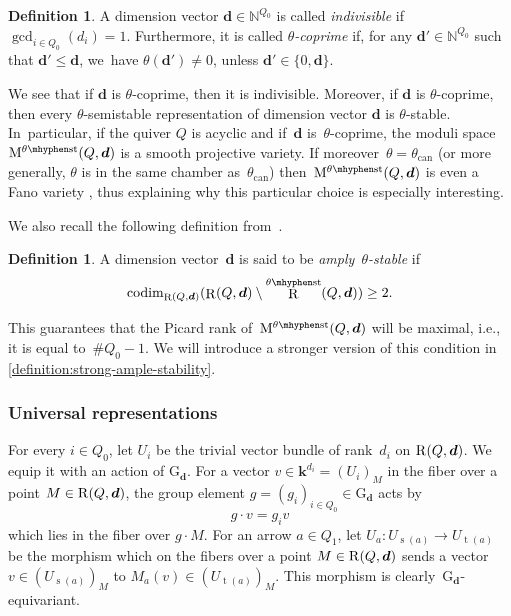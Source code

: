 \documentclass[11pt]{article}
\theoremstyle{plain}
\theoremstyle{definition}
\newtheorem{definition}[theorem]{Definition}
\DeclareMathOperator\Rep{R}
\DeclareMathOperator\source{s}
\DeclareMathOperator\target{t}
\newcommand\can{\ensuremath{\mathrm{can}}}
\newcommand\dash{\nobreakdash-\hspace{0pt}}
\newcommand\field{\mathbf{k}}
\newcommand\group[1][\tuple{d}]{\mathrm{G}_{#1}}
\newcommand\stable{\ensuremath{\mhyphen\mathrm{st}}}
\newcommand\tuple[1]{\ensuremath{{\boldsymbol{#1}}}}
\begin{document}
\begin{definition}
A dimension vector $\tuple{d} \in \mathbb{N}^{Q_0}$ is called \emph{indivisible}
if $\gcd_{i \in Q_0}(d_i) = 1$.
Furthermore, it is called \emph{$\theta$-coprime} if,
for any $\tuple{d'} \in \mathbb{N}^{Q_0}$ such that $\tuple{d'} \leq \tuple{d}$, we~have $\theta(\tuple{d'}) \neq 0$,
unless $\tuple{d'} \in \{0,\tuple{d}\}$.
\end{definition}
We see that if $\tuple{d}$ is $\theta$-coprime, then it is indivisible.
Moreover, if $\tuple{d}$ is $\theta$-coprime,
then every $\theta$-semistable representation of dimension vector $\tuple{d}$ is $\theta$-stable. In~particular, if the quiver $Q$ is acyclic and if~$\tuple{d}$ is~$\theta$\dash coprime,
the moduli space~$\modulispace[\theta\stable]{Q,\tuple{d}}$ is a smooth projective variety.
If moreover~$\theta=\theta_\can$ (or more generally, $\theta$ is in the same chamber as~$\theta_\can$)
then~$\modulispace[\theta\stable]{Q,\tuple{d}}$ is even a Fano variety \cite{MR4352662},
thus explaining why this particular choice is especially interesting.

We also recall the following definition from~\cite[Def.\,4.1]{MR3683503}.
\begin{definition}
\label{definition:ample-stability}
A dimension vector~$\tuple{d}$ is said to be \emph{amply~$\theta$-stable} if
\begin{equation*}
\operatorname{codim}_{\Rep(Q,\tuple{d})}(\Rep(Q,\tuple{d})\setminus\Rep^{\theta\stable}(Q,\tuple{d}))\geq 2.
\end{equation*}
\end{definition}
This guarantees that the Picard rank of~$\modulispace[\theta\stable]{Q,\tuple{d}}$ will be maximal,
i.e., it is equal to~$\#Q_0-1$.
We will introduce a stronger version of this condition in \cref{definition:strong-ample-stability}.

\subsubsection*{Universal representations}
For every $i \in Q_0$,
let $U_i$ be the trivial vector bundle of rank~$d_i$ on $\repspace{Q,\tuple{d}}$.
We equip it with an action of $\group$.
For a vector $v \in \field^{d_i} = (U_i)_M$ in the fiber over a point $M \in \repspace{Q,\tuple{d}}$,
the group element $g=(g_i)_{i\in Q_0} \in \group$ acts by
\begin{equation*}
g \cdot v = g_iv
\end{equation*}
which lies in the fiber over $g\cdot M$.
For an arrow $a \in Q_1$,
let $U_a\colon U_{\source(a)} \to U_{\target(a)}$ be
the morphism which on the fibers over a point $M \in \repspace{Q,\tuple{d}}$
sends a vector $v \in (U_{\source(a)})_M$ to $M_a(v) \in (U_{\target(a)})_M$.
This morphism is clearly~$\group$\dash equivariant.
\end{document}
